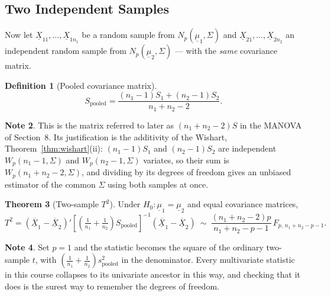 \documentclass[11pt,a4paper]{article}
\theoremstyle{definition}
\newtheorem{thm}{Theorem}[section]
\newtheorem{defn}[thm]{Definition}
\newtheorem{note}[thm]{Note}
\begin{document}
\subsection{Two Independent Samples}

Now let $\underline{X}_{11},\dots,\underline{X}_{1n_1}$ be a random sample from
$N_p(\underline{\mu}_1,\Sigma)$ and
$\underline{X}_{21},\dots,\underline{X}_{2n_2}$ an independent random sample
from $N_p(\underline{\mu}_2,\Sigma)$ --- with the \emph{same} covariance matrix.

\begin{defn}[Pooled covariance matrix]
$$S_{\text{pooled}}
= \frac{(n_1-1)S_1 + (n_2-1)S_2}{n_1+n_2-2}.$$
\end{defn}

\begin{note}
This is the matrix referred to later as $\left(n_1+n_2-2\right)S$ in the MANOVA
of Section~8. Its justification is the additivity of the Wishart,
Theorem~\ref{thm:wishart}(ii): $(n_1-1)S_1$ and $(n_2-1)S_2$ are independent
$W_p(n_1-1,\Sigma)$ and $W_p(n_2-1,\Sigma)$ variates, so their sum is
$W_p(n_1+n_2-2,\Sigma)$, and dividing by its degrees of freedom gives an
unbiased estimator of the common $\Sigma$ using both samples at once.
\end{note}

\begin{thm}[Two-sample $T^{2}$]
\label{thm:twosampleT2}
Under $H_0:\underline{\mu}_1=\underline{\mu}_2$ and equal covariance matrices,
$$T^{2} = \left(\overline{\underline{X}}_1-\overline{\underline{X}}_2\right)'
\left[\left(\tfrac{1}{n_1}+\tfrac{1}{n_2}\right)S_{\text{pooled}}\right]^{-1}
\left(\overline{\underline{X}}_1-\overline{\underline{X}}_2\right)
\ \sim\ \frac{\left(n_1+n_2-2\right)p}{n_1+n_2-p-1}\,F_{p,\,n_1+n_2-p-1}.$$
\end{thm}

\begin{note}
Set $p=1$ and the statistic becomes the square of the ordinary two-sample
$t$, with $\left(\tfrac{1}{n_1}+\tfrac{1}{n_2}\right)s^{2}_{\text{pooled}}$ in
the denominator. Every multivariate statistic in this course collapses to its
univariate ancestor in this way, and checking that it does is the surest way to
remember the degrees of freedom.
\end{note}
\end{document}
